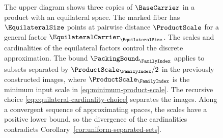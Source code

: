 \begin{figure}[H]
\caption{The upper diagram shows three copies of
$\BaseCarrier$
in a product with an equilateral space.
The marked fiber has
$\EquilateralSize$
points at pairwise distance
$\ProductScale$
for a general factor
$\EquilateralCarrier_\EquilateralSize$.
The scales and cardinalities of the equilateral factors control the
 discrete approximation.
The bound
$\PackingBound_{\FamilyIndex}$
applies to subsets separated by
$\ProductScale_{\FamilyIndex}/2$
in the previously constructed images,
where
$\ProductScale_{\FamilyIndex}$
is the minimum input scale in \eqref{eq:minimum-product-scale}.
The recursive choice \eqref{eq:equilateral-cardinality-choice}
separates the images.
Along a convergent sequence of approximating spaces,
the scales have a positive lower bound,
so the divergence of the cardinalities contradicts
Corollary~\ref{cor:uniform-separated-sets}.}
\label{fig:discrete-approximation}
\end{figure}
